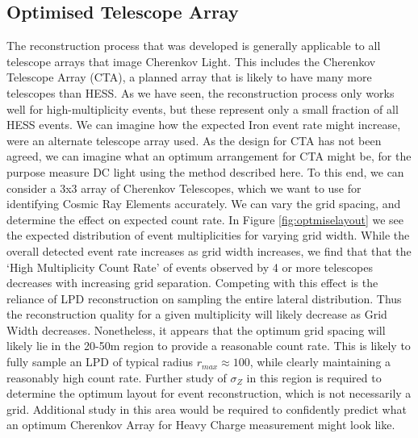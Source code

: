 \documentclass[11pt]{article}
\begin{document}
\subsection{Optimised Telescope Array}
The reconstruction process that was developed is generally applicable to all telescope arrays that image Cherenkov Light. This includes the Cherenkov Telescope Array (CTA), a planned array that is likely to have many more telescopes than HESS. As we have seen, the reconstruction process only works well for high-multiplicity events, but these represent only a small fraction of all HESS events. We can imagine how the expected Iron event rate might increase, were an alternate telescope array used. As the design for CTA has not been agreed, we can imagine what an optimum arrangement for CTA might be, for the purpose measure DC light using the method described here. To this end, we can consider a 3x3 array of Cherenkov Telescopes, which we want to use for identifying Cosmic Ray Elements accurately. We can vary the grid spacing, and determine the effect on expected count rate. In Figure \ref{fig:optmiselayout} we see the expected distribution of event multiplicities for varying grid width. While the overall detected event rate increases as grid width increases, we find that that the \textquoteleft High Multiplicity Count Rate' of events observed by 4 or more telescopes decreases with increasing grid separation. Competing with this effect is the reliance of LPD reconstruction on sampling the entire lateral distribution. Thus the reconstruction quality for a given multiplicity will likely decrease as Grid Width decreases. Nonetheless, it appears that the optimum grid spacing will likely lie in the 20-50m region to provide a reasonable count rate. This is likely to fully sample an LPD of typical radius $r_{max} \approx 100$, while clearly maintaining a reasonably high count rate. Further study of $\sigma_{Z}$ in this region is required to determine the optimum layout for event reconstruction, which is not necessarily a grid. Additional study in this area would be required to confidently predict what an optimum Cherenkov Array for Heavy Charge measurement might look like.
\end{document}
